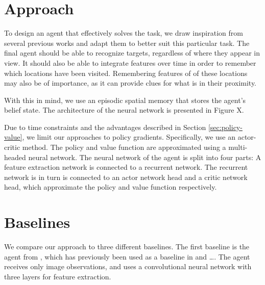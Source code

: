 \section{Approach}
\label{sec:approach}



To design an agent that effectively solves the task, we draw inspiration from several previous works and adapt them to better suit this particular task.
The final agent should be able to recognize targets, regardless of where they appear in view.
It should also be able to integrate features over time in order to remember which locations have been visited.
Remembering features of of these locations may also be of importance,
as it can provide clues for what is in their proximity. 

With this in mind, we use an episodic spatial memory that stores the agent's belief state.
The architecture of the neural network is presented in Figure X.


Due to time constraints and the advantages described in Section \ref{sec:policy-value}, we limit our approaches to policy gradients.
Specifically, we use an actor-critic method.
The policy and value function are approximated using a multi-headed neural network.
The neural network of the agent is split into four parts:
A feature extraction network is connected to a recurrent network.
The recurrent network is in turn is connected to an actor network head and a critic network head, which approximate the policy and value function respectively.

\section{Baselines}
\label{sec:baseline}

We compare our approach to three different baselines.
The first baseline is the agent from \cite{mnih_human_2015}, which has previously been used as a baseline in \cite{mirowski_navigate_2017} and \dots.
The agent receives only image observations, and uses a convolutional neural network with three layers for feature extraction.

